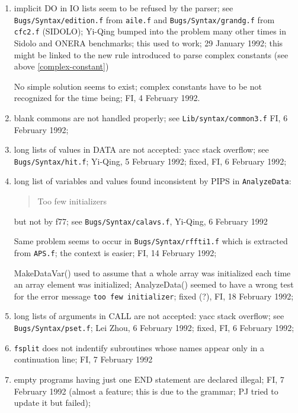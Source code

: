 \begin{enumerate}
  \item \label{implicit-do}
	implicit DO in IO lists seem to be refused by the parser; see
	\verb+Bugs/Syntax/edition.f+ from \verb+aile.f+ and
	\verb+Bugs/Syntax/grandg.f+ from \verb+cfc2.f+ (SIDOLO);
	Yi-Qing bumped into the problem many other times in Sidolo
	and ONERA benchmarks; this used to work; 29 January 1992;
	this might be linked to the new rule introduced to parse
	complex constants (see above \ref{complex-constant})

	No simple solution seems to exist; complex constants have
	to be not recognized for the time being; FI, 4 February 1992.

  \item blank commons are not handled properly; see \verb+Lib/syntax/common3.f+
	FI, 6 February 1992;

  \item long lists of values in DATA are not accepted: yacc stack overflow;
	see \verb+Bugs/Syntax/hit.f+; Yi-Qing, 5 February 1992;
	fixed, FI, 6 February 1992;

  \item long list of variables and values found inconsistent by PIPS in
	\verb+AnalyzeData+:
	\begin{quote}
	Too few initializers
	\end{quote}
	but not by f77; see \verb+Bugs/Syntax/calavs.f+, Yi-Qing,
	6 February 1992

	Same problem seems to occur in \verb+Bugs/Syntax/rffti1.f+ which
	is extracted from \verb+APS.f+; the context is easier;
	FI, 14 February 1992;

	MakeDataVar() used to assume that a whole array was initialized
	each time an array element was initialized; AnalyzeData() seemed
	to have a wrong test for the error message \verb+too few initializer+;
	fixed (?), FI, 18 February 1992;

  \item long lists of arguments in CALL are not accepted: yacc stack overflow;
	see \verb+Bugs/Syntax/pset.f+; Lei Zhou, 6 February 1992;
	fixed, FI, 6 February 1992;

  \item \verb+fsplit+ does not indentify subroutines whose names appear
	only in a continuation line; FI, 7 February 1992

  \item empty programs having just one END statement are declared illegal;
	FI, 7 February 1992 (almost a feature; this is due to the grammar;
	PJ tried to update it but failed);


\end{enumerate}
